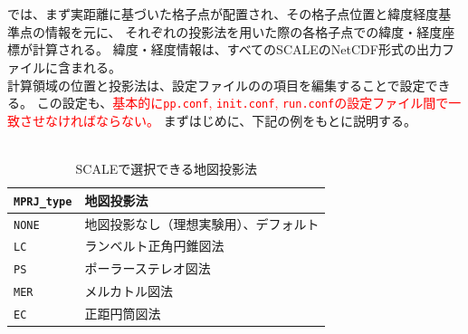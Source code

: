 \section{\SecAdvanceMapprojectionSetting} \label{subsec:adv_mapproj}
\scalerm では、まず実距離に基づいた格子点が配置され、その格子点位置と緯度経度基準点の情報を元に、
それぞれの投影法を用いた際の各格子点での緯度・経度座標が計算される。
緯度・経度情報は、すべてのSCALEのNetCDF形式の出力ファイルに含まれる。\\
計算領域の位置と投影法は、設定ファイルのの項目を編集することで設定できる。
この設定も、\textcolor{red}{基本的に\texttt{pp.conf}, \texttt{init.conf}, \texttt{run.conf}の設定ファイル間で一致させなければならない。}
まずはじめに、下記の例をもとに説明する。\\

\\

\begin{table}[b]
\begin{center}
\caption{SCALEで選択できる地図投影法}
\begin{tabularx}{150mm}{|l|X|} \hline
 \rowcolor[gray]{0.9} \verb|MPRJ_type| & 地図投影法 \\ \hline
 \verb|NONE| & 地図投影なし（理想実験用）、デフォルト \\ \hline
 \verb|LC|   & ランベルト正角円錐図法              \\ \hline
 \verb|PS|   & ポーラーステレオ図法                \\ \hline
 \verb|MER|  & メルカトル図法                     \\ \hline
 \verb|EC|   & 正距円筒図法                       \\ \hline
\end{tabularx}
\label{tab:map_proj}
\end{center}
\end{table}

